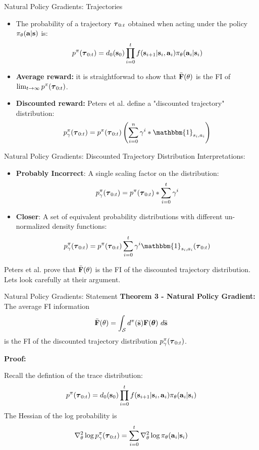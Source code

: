\documentclass[]{beamer}
\begin{document}
\begin{frame}{Natural Policy Gradients: Trajectories}

    \begin{itemize}
        \item The probability of a trajectory $\mbox{$\mbox{$\boldsymbol{\tau}$}$}_{0:t}$ obtained when acting under the policy $\pi_\theta(\mbox{$\mbox{$\mathbf{a}$}$} | \mbox{$\mbox{$\mathbf{s}$}$})$ is:
        \[ p^\pi(\mbox{$\mbox{$\boldsymbol{\tau}$}$}_{0:t}) = d_0(\mbox{$\mbox{$\mathbf{s}$}$}_0) \prod_{i=0}^t f(\mbox{$\mbox{$\mathbf{s}$}$}_{i+1} | \mbox{$\mbox{$\mathbf{s}$}$}_i, \mbox{$\mbox{$\mathbf{a}$}$}_i) \pi_\theta(\mbox{$\mbox{$\mathbf{a}$}$}_i | \mbox{$\mbox{$\mathbf{s}$}$}_i) \]
        \item \textbf{Average reward:} it is straightforwad to show that $\bar {\mbox{$\mbox{$\mathbf{F}$}$}}(\theta)$ is the FI of $\lim_{t \rightarrow \infty} p^\pi(\mbox{$\mbox{$\boldsymbol{\tau}$}$}_{0:t})$.
        \item \textbf{Discounted reward:} Peters et al. \cite{peters2003reinforcement} define a "discounted trajectory" distribution:
        \[ p_\gamma^\pi(\vtau_{0:t}) = p^\pi(\vtau_{0:t}) \left(\sum_{i=0}^n \gamma^i * \mathbbm{1}_{s_i, a_i} \right) \]
    \end{itemize}

\end{frame}

\begin{frame}{Natural Policy Gradients: Discounted Trajectory Distribution}
    Interpretations:
    \begin{itemize}
        \item \textbf{Probably Incorrect}: A single scaling factor on the distribution:
            \[ p_\gamma^\pi(\mbox{$\mbox{$\boldsymbol{\tau}$}$}_{0:t}) = p^\pi(\mbox{$\mbox{$\boldsymbol{\tau}$}$}_{0:t}) * \sum_{i=0}^t \gamma^i  \]
        \item \textbf{Closer}: A set of equivalent probability distributions with different un-normalized density functions:
             \[ p_\gamma^\pi(\vtau_{0:t}) = p^\pi(\vtau_{0:t}) \sum_{i=0}^t \gamma^i \mathbbm{1}_{s_i, a_i}(\vtau_{0:t})\]
    \end{itemize}

    Peters et al. \cite{peters2003reinforcement} prove that $\bar {\mbox{$\mbox{$\mathbf{F}$}$}}(\theta)$ is the FI of the discounted trajectory distribution. Lets look carefully at their argument.

\end{frame}

\begin{frame}{Natural Policy Gradients: Statement}
    \textbf{Theorem 3 - Natural Policy Gradient:} \cite{peters2003reinforcement} The average FI information
    \[\bar {\mbox{$\mbox{$\mathbf{F}$}$}}(\theta) = \int_{\mathcal{S}} d^\pi(\bar {\mbox{$\mbox{$\mathbf{s}$}$}}) \mbox{$\mbox{$\mathbf{F}$}$}(\mbox{$\mbox{$\boldsymbol{\theta}$}$}) \ d\bar {\mbox{$\mbox{$\mathbf{s}$}$}}\]
    is the FI of the discounted trajectory distribution $p_\gamma^\pi(\mbox{$\mbox{$\boldsymbol{\tau}$}$}_{0:t})$.

    \textbf{Proof:}

    Recall the defintion of the trace distribution:
        \[ p^\pi(\mbox{$\mbox{$\boldsymbol{\tau}$}$}_{0:t}) = d_0(\mbox{$\mbox{$\mathbf{s}$}$}_0) \prod_{i=0}^t f(\mbox{$\mbox{$\mathbf{s}$}$}_{i+1} | \mbox{$\mbox{$\mathbf{s}$}$}_i, \mbox{$\mbox{$\mathbf{a}$}$}_i) \pi_\theta(\mbox{$\mbox{$\mathbf{a}$}$}_i | \mbox{$\mbox{$\mathbf{s}$}$}_i) \]
    The Hessian of the log probability is
        \[ \nabla^2_\theta \log p_\gamma^\pi(\mbox{$\mbox{$\boldsymbol{\tau}$}$}_{0:t}) = \sum_{i=0}^t \nabla^2_\theta \log \pi_\theta(\mbox{$\mbox{$\mathbf{a}$}$}_i | \mbox{$\mbox{$\mathbf{s}$}$}_i) \]

\end{frame}
\end{document}
